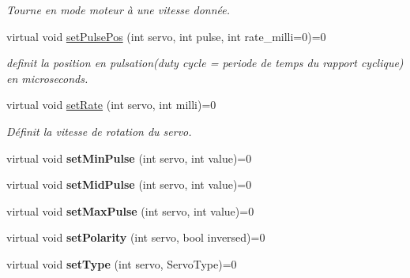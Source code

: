 \begin{DoxyCompactItemize}
\begin{DoxyCompactList}\small\item\em Tourne en mode moteur à une vitesse donnée. \end{DoxyCompactList}\item 
\mbox{\label{classAServoDriver_ae62c47db79d56930d8b51f91da9907af}} 
virtual void \hyperlink{classAServoDriver_ae62c47db79d56930d8b51f91da9907af}{set\+Pulse\+Pos} (int servo, int pulse, int rate\+\_\+milli=0)=0
\begin{DoxyCompactList}\small\item\em definit la position en pulsation(duty cycle = periode de temps du rapport cyclique) en microseconds. \end{DoxyCompactList}\item 
\mbox{\label{classAServoDriver_a615a611ba1daaa290b5bd0f442b1ff19}} 
virtual void \hyperlink{classAServoDriver_a615a611ba1daaa290b5bd0f442b1ff19}{set\+Rate} (int servo, int milli)=0
\begin{DoxyCompactList}\small\item\em Définit la vitesse de rotation du servo. \end{DoxyCompactList}\item 
\mbox{\label{classAServoDriver_ac0f03a69563322014fc956c1a24078ae}} 
virtual void {\bfseries set\+Min\+Pulse} (int servo, int value)=0
\item 
\mbox{\label{classAServoDriver_a33b073e7c2c9bce6cd7002ddc9786b83}} 
virtual void {\bfseries set\+Mid\+Pulse} (int servo, int value)=0
\item 
\mbox{\label{classAServoDriver_a2c8ca2180aab710c796a8a52587adaa8}} 
virtual void {\bfseries set\+Max\+Pulse} (int servo, int value)=0
\item 
\mbox{\label{classAServoDriver_a9fc6590e81391fc05ea59b5512c982ad}} 
virtual void {\bfseries set\+Polarity} (int servo, bool inversed)=0
\item 
\mbox{\label{classAServoDriver_a31b38e09e476fb9895dd012d9d3100a0}} 
virtual void {\bfseries set\+Type} (int servo, Servo\+Type)=0
\item 

\end{DoxyCompactItemize}
